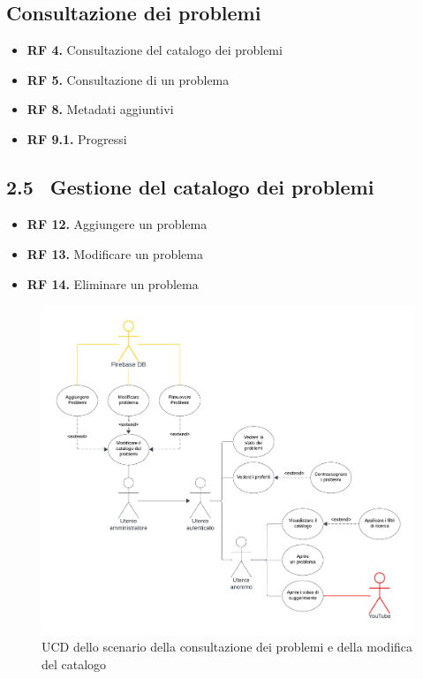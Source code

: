 \documentclass[11pt, a4paper]{article}
\theoremstyle{definition} %
\begin{document}
\newpage
\subsection{Consultazione dei problemi}
\begin{itemize}
    \item \textbf{RF 4.} Consultazione del catalogo dei problemi
    \item \textbf{RF 5.} Consultazione di un problema
    \item \textbf{RF 8.} Metadati aggiuntivi
    \item \textbf{RF 9.1.} Progressi
\end{itemize}
\subsection*{2.5\texttt{ }\textit{ } Gestione del catalogo dei problemi}
\begin{itemize}
    \item \textbf{RF 12.} Aggiungere un problema
    \item \textbf{RF 13.} Modificare un problema
    \item \textbf{RF 14.} Eliminare un problema
\end{itemize}

\begin{figure}[H]
\centering
\hspace*{-0.5cm}
\includegraphics[scale=0.57]{materiale/ucdiagrams/ucproblemi.pdf}
\caption{UCD dello scenario della consultazione dei problemi e della modifica del catalogo}
\end{figure}
\end{document}
